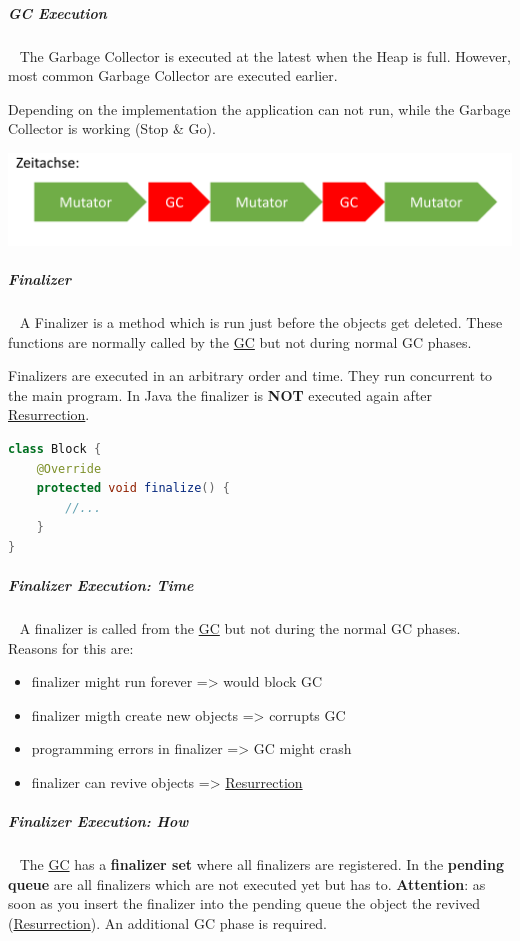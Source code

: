 \documentclass[11pt,twoside,landscape]{article}
\begin{document}
\begin{multicols}{3}
\subparagraph{GC Execution} \
\label{sec:orga998926}
The Garbage Collector is executed at the latest when the Heap is full.
However, most common Garbage Collector are executed earlier.

Depending on the implementation the application can not run, while the Garbage Collector is working (Stop \& Go).


{
\begin{center}
\includegraphics[width=.9\linewidth]{img/stop_and_go_gc.png}
\end{center}
\label{fig:stop-go-gc}
}

\subparagraph{Finalizer} \
\label{sec:orgac42d44}
A Finalizer is a method which is run just before the objects get deleted.
These functions are normally called by the \href{../../../roam/20211008083744-garbage_collection.org}{GC} but not during normal GC phases.

Finalizers are executed in an arbitrary order and time.
They run concurrent to the main program.
In Java the finalizer is \textbf{NOT} executed again after \href{../../../roam/20221231095240-what_is_resurrection.org}{Resurrection}.

\begin{lstlisting}[language=java,numbers=none]
class Block {
    @Override
    protected void finalize() {
        //...
    }
}
\end{lstlisting}
\subparagraph{Finalizer Execution: Time} \
\label{sec:orge5847f5}
A finalizer is called from the \href{../../../roam/20211008083744-garbage_collection.org}{GC} but not during the normal GC phases. 
Reasons for this are:
\begin{itemize}
\item finalizer might run forever => would block GC
\item finalizer migth create new objects => corrupts GC
\item programming errors in finalizer => GC might crash
\item finalizer can revive objects => \href{../../../roam/20221231095240-what_is_resurrection.org}{Resurrection}
\end{itemize}
\subparagraph{Finalizer Execution: How} \
\label{sec:org58efcdf}
The \href{../../../roam/20211008083744-garbage_collection.org}{GC} has a \textbf{finalizer set} where all finalizers are registered.
In the \textbf{pending queue} are all finalizers which are not executed yet but has to.
\textbf{Attention}: as soon as you insert the finalizer into the pending queue the object the revived (\href{../../../roam/20221231095240-what_is_resurrection.org}{Resurrection}).
An additional GC phase is required.



\end{multicols}
\end{document}
